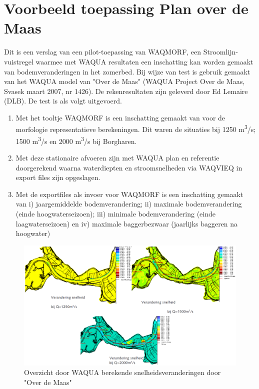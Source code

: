 \chapter{Voorbeeld toepassing Plan over de Maas}

Dit is een verslag van een pilot-toepassing van WAQMORF, een Stroomlijn-vuistregel waarmee met WAQUA resultaten een inschatting kan worden gemaakt van bodemveranderingen in het zomerbed.
Bij wijze van test is gebruik gemaakt van het WAQUA model van "Over de Maas" (WAQUA Project Over de Maas, Svasek maart 2007, nr 1426). De rekenresultaten zijn geleverd door Ed Lemaire (DLB).
De test is als volgt uitgevoerd.

\begin{enumerate}
\item Met het tooltje WAQMORF is een inschatting gemaakt van voor de morfologie representatieve berekeningen.
Dit waren de situaties bij 1250 m\textsuperscript{3}/s; 1500 m\textsuperscript{3}/s en 2000 m\textsuperscript{3}/s bij Borgharen.

\item Met deze stationaire afvoeren zijn met WAQUA plan en referentie doorgerekend waarna waterdiepten en stroomsnelheden via WAQVIEQ in export files zijn opgeslagen.

\item Met de exportfiles als invoer voor WAQMORF is een inschatting gemaakt van i) jaargemiddelde bodemverandering; ii) maximale bodemverandering (einde hoogwaterseizoen); iii) minimale bodemverandering (einde laagwaterseizoen) en iv) maximale baggerbezwaar (jaarlijks baggeren na hoogwater)
\end{enumerate}

\begin{figure}
\includegraphics[width=\columnwidth]{figures/Fig13.png}
\caption{Overzicht door WAQUA berekende snelheidsveranderingen door "Over de Maas"}
\label{Fig13}
\end{figure}

